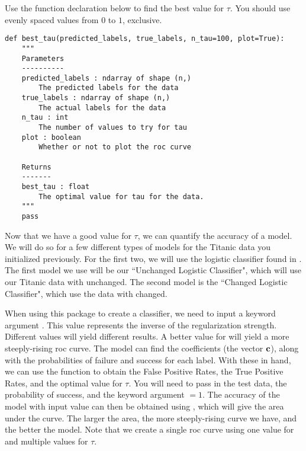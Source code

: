\begin{problem}
Use the function declaration below to find the best value for $\tau$.  You should use evenly spaced values from $0$ to $1$, exclusive.
\begin{lstlisting}
def best_tau(predicted_labels, true_labels, n_tau=100, plot=True):
    """
    Parameters
    ----------
    predicted_labels : ndarray of shape (n,)
        The predicted labels for the data
    true_labels : ndarray of shape (n,)
        The actual labels for the data
    n_tau : int
        The number of values to try for tau
    plot : boolean
        Whether or not to plot the roc curve

    Returns
    -------
    best_tau : float
        The optimal value for tau for the data.
    """
    pass
\end{lstlisting}
\end{problem}

Now that we have a good value for $\tau$, we can quantify the accuracy of a model. We will do so for a few different types of models for the Titanic data you initialized previously.  For the first two, we will use the logistic classifier found in .  The first model we use will be our ``Unchanged Logistic Classifier", which will use our Titanic data with  unchanged.  The second model is the ``Changed Logistic Classifier", which use the data with  changed.

When using this package to create a classifier, we need to input a keyword argument .  This value represents the inverse of the regularization strength.  Different values will yield different results.  A better value for  will yield a more steeply-rising roc curve.  The model can find the coefficients (the vector $\bf{c}$), along with the probabilities of failure and success for each label.  With these in hand, we can use the function  to obtain the False Positive Rates, the True Positive Rates, and the optimal value for $\tau$.  You will need to pass in the test data, the probability of success, and the keyword argument  $= 1$.  The accuracy of the model with input value  can then be obtained using , which will give the area under the curve.  The larger the area, the more steeply-rising curve we have, and the better the model.  Note that we create a single roc curve using one value for  and multiple values for $\tau$.

